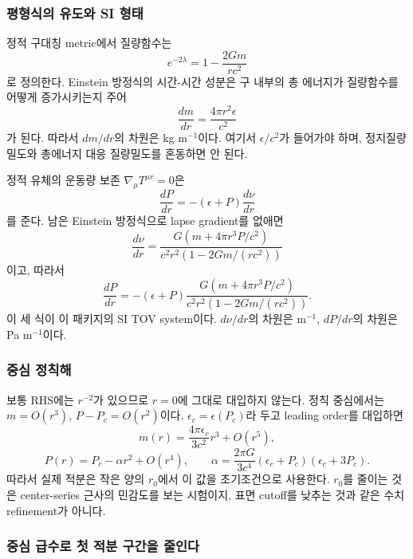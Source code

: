 \documentclass[
  10pt,
  a4paper,
]{article}
\begin{document}
\subsubsection{평형식의 유도와 SI
형태}\label{uxd3c9uxd615uxc2dduxc758-uxc720uxb3c4uxc640-si-uxd615uxd0dc}

정적 구대칭 metric에서 질량함수는 \[
e^{-2\lambda}=1-\frac{2Gm}{rc^2}
\] 로 정의한다. Einstein 방정식의 시간-시간 성분은 구 내부의 총 에너지가
질량함수를 어떻게 증가시키는지 주어 \[
\boxed{\frac{dm}{dr}=\frac{4\pi r^2\epsilon}{c^2}}
\] 가 된다. 따라서 \(dm/dr\)의 차원은 kg m\(^{-1}\)이다. 여기서
\(\epsilon/c^2\)가 들어가야 하며, 정지질량밀도와 총에너지 대응
질량밀도를 혼동하면 안 된다.

정적 유체의 운동량 보존 \(\nabla_\mu T^{\mu r}=0\)은 \[
\frac{dP}{dr}=-(\epsilon+P)\frac{d\nu}{dr}
\] 를 준다. 남은 Einstein 방정식으로 lapse gradient를 없애면 \[
\boxed{\frac{d\nu}{dr}=\frac{G\left(m+4\pi r^3P/c^2\right)}{c^2r^2\left(1-2Gm/(rc^2)\right)}}
\] 이고, 따라서 \[
\boxed{\frac{dP}{dr}=-(\epsilon+P)
\frac{G\left(m+4\pi r^3P/c^2\right)}{c^2r^2\left(1-2Gm/(rc^2)\right)}}.
\] 이 세 식이 이 패키지의 SI TOV system이다. \(d\nu/dr\)의 차원은
m\(^{-1}\), \(dP/dr\)의 차원은 Pa m\(^{-1}\)이다.

\subsubsection{중심 정칙해}\label{uxc911uxc2ec-uxc815uxce59uxd574}

보통 RHS에는 \(r^{-2}\)가 있으므로 \(r=0\)에 그대로 대입하지 않는다.
정칙 중심에서는 \(m=O(r^3)\), \(P-P_c=O(r^2)\)이다.
\(\epsilon_c=\epsilon(P_c)\)라 두고 leading order를 대입하면 \[
\boxed{m(r)=\frac{4\pi\epsilon_c}{3c^2}r^3+O(r^5)},
\] \[
\boxed{P(r)=P_c-\alpha r^2+O(r^4)},\qquad
\alpha=\frac{2\pi G}{3c^4}(\epsilon_c+P_c)(\epsilon_c+3P_c).
\] 따라서 실제 적분은 작은 양의 \(r_0\)에서 이 값을 초기조건으로
사용한다. \(r_0\)를 줄이는 것은 center-series 근사의 민감도를 보는
시험이지, 표면 cutoff를 낮추는 것과 같은 수치 refinement가 아니다.

\subsubsection{중심 급수로 첫 적분 구간을
줄인다}\label{uxc911uxc2ec-uxae09uxc218uxb85c-uxccab-uxc801uxbd84-uxad6cuxac04uxc744-uxc904uxc778uxb2e4}
\end{document}
